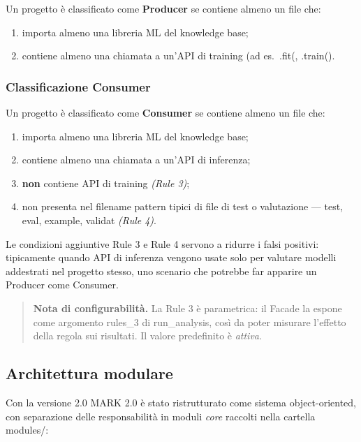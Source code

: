 \documentclass[11pt,a4paper]{article}
\makeatletter
\newcommand{\baselineName}{MARK 2.0}
\newif\ifmark@prevlower
\def\mark@casebreak#1{%
  \ifcat\noexpand#1\relax
    \mark@prevlowerfalse
  \else
    \ifnum`#1=\uccode`#1\relax
      \ifmark@prevlower\allowbreak\fi
      \mark@prevlowerfalse
    \else
      \ifnum`#1=\lccode`#1\relax
        \mark@prevlowertrue
      \else
        \mark@prevlowerfalse
      \fi
    \fi
  \fi}
\def\mark@brk#1{%
  \ifx#1\mark@stop
    \let\mark@next\relax
  \else
    \mark@casebreak{#1}%
    #1%
    \ifx#1.\allowbreak\else
      \ifx#1\_\allowbreak\else
        \ifx#1/\allowbreak\else
          \ifx#1(\allowbreak\fi
        \fi
      \fi
    \fi
    \let\mark@next\mark@brk
  \fi
  \mark@next}
\def\mark@stop{\mark@stop}
\DeclareRobustCommand{\mark@code}[1]{%
  \ifmmode
    \text{\ttfamily\small\mark@prevlowerfalse\mark@brk#1\mark@stop}%
  \else
    {\ttfamily\small\mark@prevlowerfalse\mark@brk#1\mark@stop}%
  \fi}
\DeclareRobustCommand{\code}[1]{\mark@code{#1}}
\DeclareRobustCommand{\meth}[1]{\mark@code{#1}}
\DeclareRobustCommand{\pkgpath}[1]{\mark@code{#1}}
\DeclareRobustCommand{\flag}[1]{\mark@code{#1}}
\def\mark@code#1{#1}%
\def\code#1{#1}%
\def\meth#1{#1}%
\def\pkgpath#1{#1}%
\def\flag#1{#1}%
\newenvironment{keypoints}
  {\begin{quote}\small}
  {\end{quote}}
\makeatother
\begin{document}
Un progetto \`e classificato come \textbf{Producer} se contiene almeno un file
che:

\begin{enumerate}[nosep]
  \item importa almeno una libreria ML del knowledge base;
  \item contiene almeno una chiamata a un'API di training
    (ad es.\ \code{.fit(}, \code{.train(}).
\end{enumerate}

\subsubsection{Classificazione Consumer}

Un progetto \`e classificato come \textbf{Consumer} se contiene almeno un file
che:

\begin{enumerate}[nosep]
  \item importa almeno una libreria ML del knowledge base;
  \item contiene almeno una chiamata a un'API di inferenza;
  \item \textbf{non} contiene API di training \emph{(Rule 3)};
  \item non presenta nel filename pattern tipici di file di test o valutazione
    --- \code{test}, \code{eval}, \code{example}, \code{validat} \emph{(Rule 4)}.
\end{enumerate}

Le condizioni aggiuntive Rule 3 e Rule 4 servono a ridurre i falsi positivi:
tipicamente quando API di inferenza vengono usate solo per valutare modelli
addestrati nel progetto stesso, uno scenario che potrebbe far apparire un
Producer come Consumer.

\begin{keypoints}
\textbf{Nota di configurabilit\`a.} La Rule 3 \`e parametrica: il Facade la
espone come argomento \flag{rules\_3} di \meth{run\_analysis}, cos\`i da poter
misurare l'effetto della regola sui risultati. Il valore predefinito \`e
\emph{attiva}.
\end{keypoints}

\subsection{Architettura modulare}
\label{sec:architettura}

Con la versione 2.0 \baselineName{} \`e stato ristrutturato come sistema
object-oriented, con separazione delle responsabilit\`a in moduli \emph{core}
raccolti nella cartella \pkgpath{modules/}:
\end{document}
